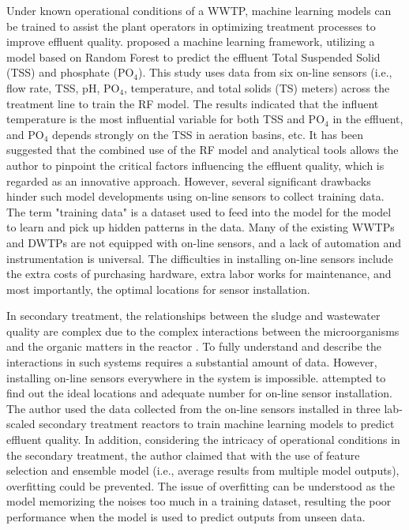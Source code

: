 Under known operational conditions of a WWTP, machine learning models can be trained to assist the plant operators in optimizing treatment processes to improve effluent quality. \citet{wangMachineLearningFramework2021} proposed a machine learning framework, utilizing a model based on Random Forest to predict the effluent Total Suspended Solid (TSS) and phosphate (PO$_4$). This study uses data from six on-line sensors (i.e., flow rate, TSS, pH, PO$_4$, temperature, and total solids (TS) meters) across the treatment line to train the RF model. The results indicated that the influent temperature is the most influential variable for both TSS and PO$_4$ in the effluent, and PO$_4$ depends strongly on the TSS in aeration basins, etc. It has been suggested that the combined use of the RF model and analytical tools allows the author to pinpoint the critical factors influencing the effluent quality, which is regarded as an innovative approach. However, several significant drawbacks hinder such model developments using on-line sensors to collect training data. The term "training data" is a dataset used to feed into the model for the model to learn and pick up hidden patterns in the data. Many of the existing WWTPs and DWTPs are not equipped with on-line sensors, and a lack of automation and instrumentation is universal. The difficulties in installing on-line sensors include the extra costs of purchasing hardware, extra labor works for maintenance, and most importantly, the optimal locations for sensor installation. 

In secondary treatment, the relationships between the sludge and wastewater quality are complex due to the complex interactions between the microorganisms and the organic matters in the reactor  \citep{wilenMechanismsGranulationActivated2018}. To fully understand and describe the interactions in such systems requires a substantial amount of data. However, installing on-line sensors everywhere in the system is impossible. \citet{zaghloulDevelopmentEnsembleMachine2021} attempted to find out the ideal locations and adequate number for on-line sensor installation. The author used the data collected from the on-line sensors installed in three lab-scaled secondary treatment reactors to train machine learning models to predict effluent quality. In addition, considering the intricacy of operational conditions in the secondary treatment, the author claimed that with the use of feature selection and ensemble model (i.e., average results from multiple model outputs), overfitting could be prevented. The issue of overfitting can be understood as the model memorizing the noises too much in a training dataset, resulting the poor performance when the model is used to predict outputs from unseen data. 

